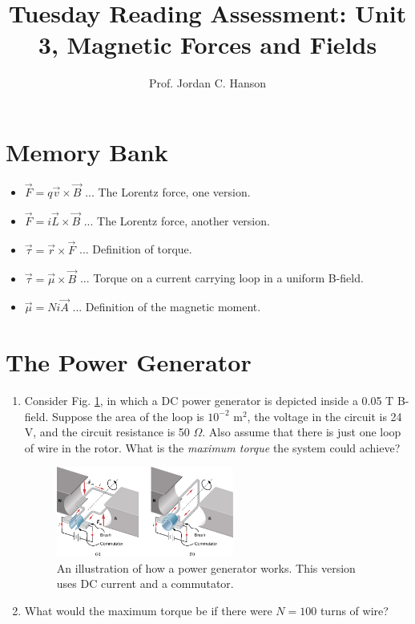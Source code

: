 \documentclass{article}
\begin{document}
\title{Tuesday Reading Assessment: Unit 3, Magnetic Forces and Fields}
\author{Prof. Jordan C. Hanson}

\maketitle

\section{Memory Bank}

\begin{itemize}
\item $\vec{F} = q\vec{v} \times \vec{B}$ ... The Lorentz force, one version.
\item $\vec{F} = i\vec{L} \times \vec{B}$ ... The Lorentz force, another version.
\item $\vec{\tau} = \vec{r} \times \vec{F}$ ... Definition of torque.
\item $\vec{\tau} = \vec{\mu} \times \vec{B}$ ... Torque on a current carrying loop in a uniform B-field.
\item $\vec{\mu} = Ni\vec{A}$ ... Definition of the magnetic moment.
\end{itemize}

\section{The Power Generator}

\begin{enumerate}
\item Consider Fig. \ref{fig:lorentz}, in which a DC power generator is depicted inside a 0.05 T B-field.  Suppose the area of the loop is $10^{-2}$ m$^{2}$, the voltage in the circuit is 24 V, and the circuit resistance is 50 $\Omega$.  Also assume that there is just one loop of wire in the rotor.  What is the \textit{maximum torque} the system could achieve? \\ \vspace{2cm}
\begin{figure}[ht]
\centering
\includegraphics[width=0.55\textwidth]{commute.jpeg}
\caption{\label{fig:lorentz} An illustration of how a power generator works.  This version uses DC current and a commutator.}
\end{figure}
\item What would the maximum torque be if there were $N = 100$ turns of wire?
\end{enumerate}
\end{document}
